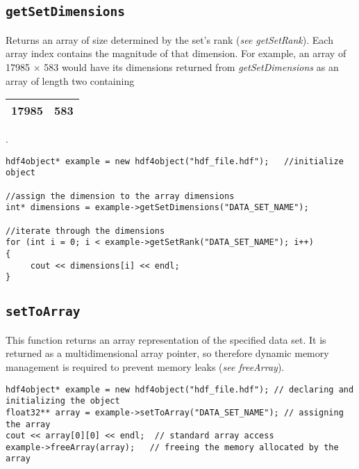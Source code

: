 \documentclass{report}
\begin{document}
\subsection*{\texttt{getSetDimensions}}
Returns an array of size determined by the set's rank (\emph{see getSetRank}).  Each array index contains the magnitude of that dimension.  For example, an array of 17985 $\times$ 583 would have its dimensions returned from \emph{getSetDimensions} as an array of length two containing
\begin{tabular}{|c | c|}
\hline
17985 & 583\\
\hline
\end{tabular}.
\begin{verbatim}
hdf4object* example = new hdf4object("hdf_file.hdf");   //initialize object

//assign the dimension to the array dimensions
int* dimensions = example->getSetDimensions("DATA_SET_NAME");   

//iterate through the dimensions
for (int i = 0; i < example->getSetRank("DATA_SET_NAME"); i++)
{
     cout << dimensions[i] << endl;
}
\end{verbatim}

\subsection*{\texttt{setToArray}}
This function returns an array representation of the specified data set.  It is returned as a multidimensional array pointer, so therefore dynamic memory management is required to prevent memory leaks (\emph{see freeArray}).
\begin{verbatim}
hdf4object* example = new hdf4object("hdf_file.hdf"); // declaring and initializing the object
float32** array = example->setToArray("DATA_SET_NAME"); // assigning the array
cout << array[0][0] << endl;  // standard array access
example->freeArray(array);   // freeing the memory allocated by the array
\end{verbatim}
\end{document}
